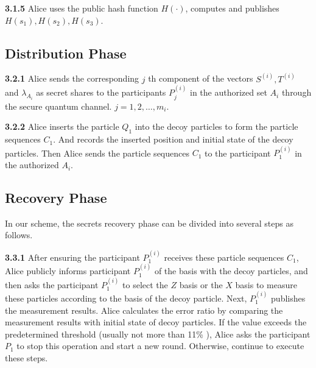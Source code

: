 \documentclass[pdflatex,sn-mathphys]{sn-jnl}%
\theoremstyle{thmstyleone}%
\theoremstyle{thmstyletwo}%
\theoremstyle{thmstylethree}%
\begin{document}
\indent\textbf{3.1.5} Alice uses the public hash function $H(\cdot)$, computes and publishes $H(s_1),H(s_2),H(s_3)$.

\subsection{Distribution Phase}\label{subsec2}

\textbf{3.2.1} Alice sends the corresponding $j$ th component of the vectors $S^{(i)},T^{(i)}$ and $\lambda_{A_i}$ as secret shares to the participants $P_j^{(i)}$ in the authorized set $A_i$ through the secure quantum channel. $j=1,2,\dots,m_i$.

\indent\textbf{3.2.2} Alice inserts the particle $Q_1$ into the decoy particles to form the particle sequences $C_1$. And records the inserted position and initial state of the decoy particles. Then Alice sends the particle sequences $C_1$ to the participant $P_1^{(i)}$ in the authorized $A_i$.

\subsection{Recovery Phase}\label{subsec3}

In our scheme, the secrets recovery phase can be divided into several steps as follows.

\indent\textbf{3.3.1} After ensuring the participant $P_1^{(i)}$ receives these particle sequences $C_1$, Alice publicly informs participant $P_1^{(i)}$ of the basis with the decoy particles, and then asks the participant $P_1^{(i)}$ to select the $Z$ basis or the $X$ basis to measure these particles according to the basis of the decoy particle. Next, $P_1^{(i)}$ publishes the measurement results. Alice calculates the error ratio by comparing the measurement results with initial state of decoy particles. If the value exceeds the predetermined threshold (usually not more than 11\% \cite{ref-ur34}), Alice asks the participant $P_1$ to stop this operation and start a new round. Otherwise, continue to execute these steps. 
\end{document}
